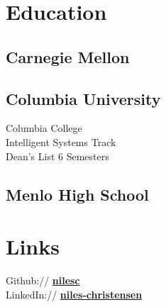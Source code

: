 \documentclass[letterpaper]{deedy-resume} %
\begin{document}
\begin{minipage}[t]{0.33\textwidth} %


\section{Education}

\subsection{Carnegie Mellon}


\sectionspace %
\subsection{Columbia University}
Columbia College \\
Intelligent Systems Track \\
Dean's List 6 Semesters\\

\sectionspace %


\subsection{Menlo High School}


\sectionspace %


\section{Links}

Github:// \href{https://github.com/nilesc}{\bf nilesc} \\
LinkedIn:// \href{https://www.linkedin.com/in/niles-christensen}{\bf niles-christensen} \\


\end{minipage}
\end{document}
